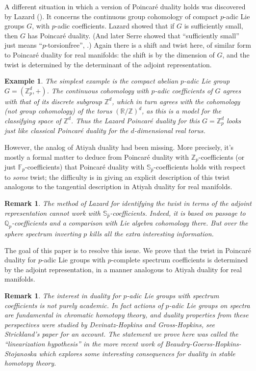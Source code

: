 \documentclass[12pt]{article}
\newtheorem{example}[theorem]{Example}
\newtheorem{remark}[theorem]{Remark}
\newcommand{\mbb}{\mathbb}
\newcommand{\wh}{\widehat}
\begin{document}
A different situation in which a version of Poincaré duality holds was discovered by Lazard (\cite{LazardGroupes}).  It concerns the continuous group cohomology of compact $p$-adic Lie groups $G$, with $p$-adic coefficients.  Lazard showed that if $G$ is sufficiently small, then $G$ has Poincaré duality. (And later Serre showed that ``sufficiently small'' just means ``$p$-torsionfree'', \cite{SerreDimension}.)  Again there is a shift and twist here, of similar form to Poincaré duality for real manifolds: the shift is by the dimension of $G$, and the twist is determined by the determinant of the adjoint representation.

\begin{example}
The simplest example is the compact abelian $p$-adic Lie group $G=(\mbb{Z}_p^d,+)$.  The continuous cohomology with $p$-adic coefficients of $G$ agrees with that of its discrete subgroup $\mbb{Z}^d$, which in turn agrees with the cohomology (not group cohomology) of the torus $(\mbb{R}/\mbb{Z})^d$, as this is a model for the classifying space of $\mbb{Z}^d$.  Thus the Lazard Poincaré duality for this $G=\mbb{Z}_p^d$ looks just like classical Poincaré duality for the $d$-dimensional real torus.
\end{example}

However, the analog of Atiyah duality had been missing.  More precisely, it's mostly a formal matter to deduce from Poincaré duality with $\mbb{Z}_p$-coefficients (or just $\mbb{F}_p$-coefficients) that Poincaré duality with $\mbb{S}_{\wh{p}}$-coefficients holds with respect to \emph{some} twist; the difficulty is in giving an explicit description of this twist analogous to the tangential description in Atiyah duality for real manifolds.

\begin{remark}
The method of Lazard for identifying the twist in terms of the adjoint representation cannot work with $\mbb{S}_{\wh{p}}$-coefficients.  Indeed, it is based on passage to $\mbb{Q}_p$-coefficients and a comparison with Lie algebra cohomology there.  But over the sphere spectrum inverting $p$ kills all the extra interesting information.
\end{remark}

The goal of this paper is to resolve this issue.  We prove that the twist in Poincaré duality for $p$-adic Lie groups with $p$-complete spectrum coefficients is determined by the adjoint representation, in a manner analogous to Atiyah duality for real manifolds.

\begin{remark}
The interest in duality for $p$-adic Lie groups with spectrum coefficients is not purely academic.  In fact actions of $p$-adic Lie groups on spectra are fundamental in chromatic homotopy theory, and duality properties from these perspectives were studied by Devinatz-Hopkins and Gross-Hopkins, see Strickland's paper \cite{StricklandDuality} for an account.  The statement we prove here was called the ``linearization hypothesis'' in the more recent work \cite{BeaudryLinearization} of Beaudry-Goerss-Hopkins-Stojanoska which explores some interesting consequences for duality in stable homotopy theory.
\end{remark}
\end{document}
